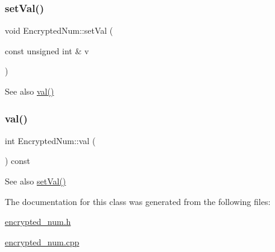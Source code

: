 \subsubsection{\texorpdfstring{set\+Val()}{setVal()}}
{\footnotesize\ttfamily void Encrypted\+Num\+::set\+Val (\begin{DoxyParamCaption}\item[{const unsigned int \&}]{v }\end{DoxyParamCaption})\hspace{0.3cm}{\ttfamily [virtual]}}

\begin{DoxySeeAlso}{See also}
\mbox{\hyperlink{class_encrypted_num_a3cb78d22a4bbb6bd3199bcf10de04366}{val()}} 
\end{DoxySeeAlso}
\mbox{\label{class_encrypted_num_a3cb78d22a4bbb6bd3199bcf10de04366}} 
\subsubsection{\texorpdfstring{val()}{val()}}
{\footnotesize\ttfamily int Encrypted\+Num\+::val (\begin{DoxyParamCaption}{ }\end{DoxyParamCaption}) const\hspace{0.3cm}{\ttfamily [virtual]}}

\begin{DoxySeeAlso}{See also}
\mbox{\hyperlink{class_encrypted_num_a4469ba057a691e6edacc25022596d1fa}{set\+Val()}} 
\end{DoxySeeAlso}


The documentation for this class was generated from the following files\+:\begin{DoxyCompactItemize}
\item 
\mbox{\hyperlink{encrypted__num_8h}{encrypted\+\_\+num.\+h}}\item 
\mbox{\hyperlink{encrypted__num_8cpp}{encrypted\+\_\+num.\+cpp}}\end{DoxyCompactItemize}

